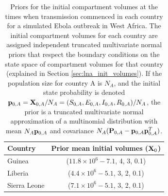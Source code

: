 \begin{table}[htbp]
	\caption[Priors for initial compartment volumes for a simulated Ebola outbreak in West Africa]{Priors for the initial compartment volumes at the times when transmission commenced in each country for a simulated Ebola outbreak in West Africa. The initial compartment volumes for each country are assigned independent truncated multivariate normal priors that respect the boundary conditions on the state space of compartment volumes for that country (explained in Section \ref{sec:lna_init_volumes}). If the population size for country A is $ N_A $, and the initial state probability is denoted $ \mathbf{p}_{0,A} = \mathbf{X}_{0,A}/N_A  = (S_{0,A}, E_{0,A}, I_{0,A}, R_{0,A})/N_A$, the prior is a truncated multivariate normal approximation of a multinomial distribution with mean $ N_A\mathbf{p}_{0,A}$ and covariance $ N_A(\mathbf{P}_{0,A} - \mathbf{p}_{0,A}\mathbf{p}_{0,A}^T) $.} 
	\label{tab:ebola_synth_initdist_priors}
	\centering
	\begin{tabular}{lc}
		\hline \textbf{Country} & \textbf{Prior mean initial volumes} ($ \mathbf{X}_0 $) \\
		\hline
		Guinea & ($ 11.8\times10^6 -7.1$, 4, 3, 0.1) \\
		Liberia & ($ 4.4\times10^6 -5.1$, 3, 2, 0.1) \\
		Sierra Leone & ($ 7.1\times10^6 -5.1$, 3, 2, 0.1) \\
		\hline
	\end{tabular}
\end{table}


